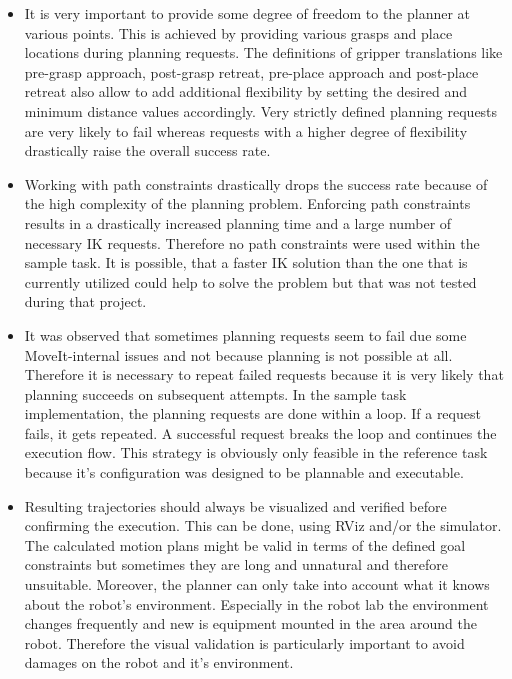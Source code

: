 \begin{itemize}

\item

It is very important to provide some degree of freedom to the planner at various points. This is achieved by providing various grasps and place locations during planning requests. The definitions of gripper translations like pre-grasp approach, post-grasp retreat, pre-place approach and post-place retreat also allow to add additional flexibility by setting the desired and minimum distance values accordingly. Very strictly defined planning requests are very likely to fail whereas requests with a higher degree of flexibility drastically raise the overall success rate.

\item

Working with path constraints drastically drops the success rate because of the high complexity of the planning problem. Enforcing path constraints results in a drastically increased planning time and a large number of necessary IK requests. Therefore no path constraints were used within the sample task. It is possible, that a faster IK solution than the one that is currently utilized could help to solve the problem but that was not tested during that project.

\item

It was observed that sometimes planning requests seem to fail due some MoveIt-internal issues and not because planning is not possible at all. Therefore it is necessary to repeat failed requests because it is very likely that planning succeeds on subsequent attempts. In the sample task implementation, the planning requests are done within a loop. If a request fails, it gets repeated. A successful request breaks the loop and continues the execution flow. This strategy is obviously only feasible in the reference task because it's configuration was designed to be plannable and executable.

\item

Resulting trajectories should always be visualized and verified before confirming the execution. This can be done, using RViz and/or the simulator. The calculated motion plans might be valid in terms of the defined goal constraints but sometimes they are long and unnatural and therefore unsuitable. Moreover, the planner can only take into account what it knows about the robot's environment. Especially in the robot lab the environment changes frequently and new is equipment mounted in the area around the robot. Therefore the visual validation is particularly important to avoid damages on the robot and it's environment.

\end{itemize}


